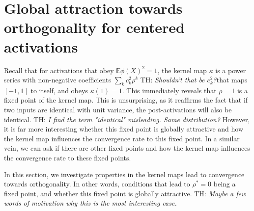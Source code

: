 \documentclass[twoside]{article}
\newcommand{\E}{\mathbb{E}}
\newtheorem{remark}{Remark}
\theoremstyle{definition}
\newtheorem{definition}{Definition}
\newcommand{\thomas}[1]{{\color{blue}TH:  \textit{#1}}}
\begin{document}
\section{Global attraction towards orthogonality for centered activations}

Recall that for activations that obey $\E \phi(X)^2 = 1$, the kernel map  $\kappa$ is a power series with non-negative coefficients $\sum_k c_k^2 \rho^k$ \thomas{Shouldn't that be $c_k^2$?}that maps $[-1,1]$ to itself, and obeys $\kappa(1)=1.$ This immediately reveals that $\rho=1$ is a fixed point of the kernel map. This is unsurprising, as it reaffirms the fact that if two inputs are identical with unit variance, the post-activations will also be identical. \thomas{I find the term "identical" misleading. Same distribution?}  However, it is far more interesting whether this fixed point is globally attractive and how the kernel map influences the convergence rate to this fixed point. In a similar vein, we can ask if there are other fixed points and how the kernel map influences the convergence rate to these fixed points.

In this section, we investigate properties in the kernel maps lead to convergence towards orthogonality. In other words, conditions that lead to $\rho^*=0$ being a fixed point, and whether this fixed point is globally attractive. \thomas{Maybe a few words of motivation why this is the most interesting case.}






\end{document}
